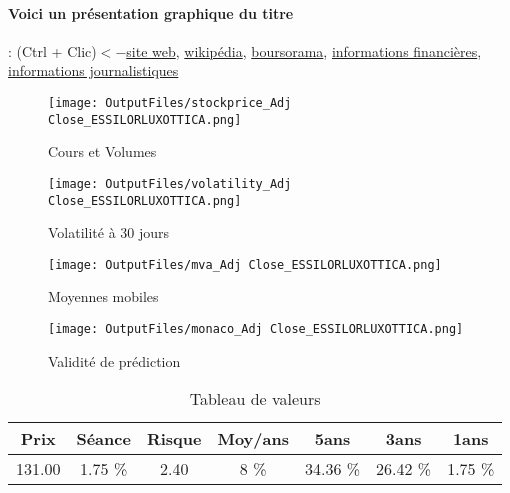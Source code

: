 \documentclass[11pt,a4paper]{report}%
\begin{document}
\paragraph{Voici un présentation graphique du titre} : (Ctrl + Clic)$<-$\href{https://www.essilorluxottica.com/fr/investisseurs}{site web}, \href{https://fr.wikipedia.org/wiki/EssilorLuxottica}{wikipédia}, \href{https://www.boursorama.com/cours/1rPEL}{boursorama}, \href{https://www.qwant.com/?q=site:https:%2f%2fwww.easybourse.com%2faction-societe%2fESSILORLUXOTTICA&t=web&client=ext-firefox-hp}{informations financières}, \href{https://bourse.lerevenu.com/cours-de-bourse/fiche-valeur-synthese/ESSILORLUXOTTICA/EL-FR}{informations journalistiques}
\begin{figure}[!htb]
   \begin{minipage}{0.5\textwidth}
     \centering
     \texttt{[image: OutputFiles/stockprice\_Adj Close\_ESSILORLUXOTTICA.png]}
     \caption{Cours et Volumes}\label{Fig:price_ESSILORLUXOTTICA}
   \end{minipage}\hfill
   \begin{minipage}{0.5\textwidth}
     \centering
     \texttt{[image: OutputFiles/volatility\_Adj Close\_ESSILORLUXOTTICA.png]}
     \caption{Volatilité à 30 jours}\label{Fig:volat_ESSILORLUXOTTICA}
   \end{minipage}
\end{figure}
\begin{figure}[!htb]
   \begin{minipage}{0.5\textwidth}
     \centering
     \texttt{[image: OutputFiles/mva\_Adj Close\_ESSILORLUXOTTICA.png]}
     \caption{Moyennes mobiles}\label{Fig:mva_ESSILORLUXOTTICA}
   \end{minipage}\hfill
   \begin{minipage}{0.5\textwidth}
     \centering
     \texttt{[image: OutputFiles/monaco\_Adj Close\_ESSILORLUXOTTICA.png]}
     \caption{Validité de prédiction}\label{Fig:prediction_ESSILORLUXOTTICA}
   \end{minipage}
\end{figure}

\begin{table}[H]
  \centering
    \begin{tabular}{|c|c|c|c|c|c|c|}
    \hline
    Prix & Séance & Risque  & Moy/ans & 5ans & 3ans & 1ans \\
    \hline
    131.00 &    1.75 \%    & 2.40 & 8 \% & 34.36 \% & 26.42 \% & 1.75 \% \\
    \hline
    \end{tabular}%
        \label{tab:table_ESSILORLUXOTTICA}%
      \caption{Tableau de valeurs}
\end{table}%
\end{document}
